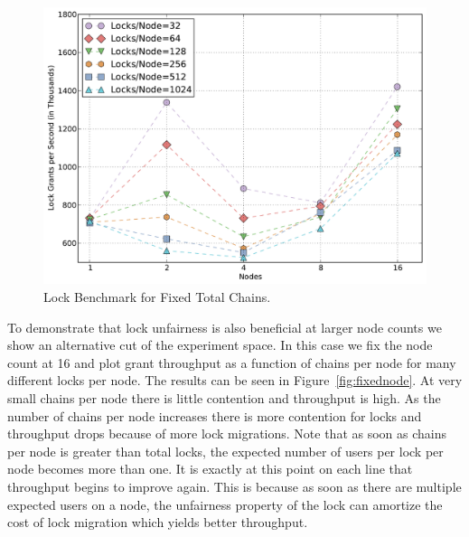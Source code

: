\begin{figure}
\begin{center}
\includegraphics[scale=0.33]{figs/fixed_lock_chains.pdf}
\end{center}
\vspace{-6mm}
\caption{Lock Benchmark for Fixed Total Chains.\label{fig:fixedlock}}
\vspace{-4mm}
\end{figure}

To demonstrate that lock unfairness is also beneficial at larger node counts we show an alternative
cut of the experiment space.  In this case we fix the node count at 16 and plot
grant throughput as a function of chains per node for many different locks per node.
The results can be seen in Figure~\ref{fig:fixednode}.  At very small chains per node
there is little contention and throughput is high.  As the number of chains per node increases there is
more contention for locks and throughput drops because of more lock migrations.  Note that 
as soon as chains per node is greater than total locks, the expected number of users per lock 
per node becomes more than one.  It is exactly at this point on each line that throughput
begins to improve again.  This is because as soon as there are multiple expected users on
a node, the unfairness property of the lock can amortize the cost of lock migration which
yields better throughput.

